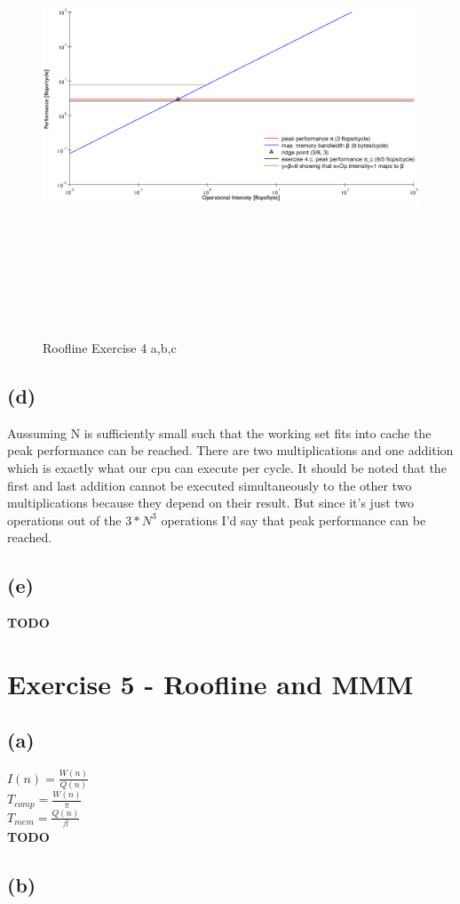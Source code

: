 \documentclass[10pt,a4paper,oneside,notitlepage]{report}
\begin{document}
\begin{landscape}
\begin{figure}[H]
\caption{Roofline Exercise 4 a,b,c}
\includegraphics[height=13cm]{roofline}
\label{roofline_plot}
\end{figure}
\end{landscape}

\subsection*{(d)}
Aussuming N is sufficiently small such that the working set fits into cache the peak performance can be reached. There are two multiplications and one addition which is exactly what our cpu can execute per cycle.
It should be noted that the first and last addition cannot be executed simultaneously to the other two multiplications because they depend on their result. But since it's just two operations out of the $3*N^3$ operations I'd say that peak performance can be reached.

\subsection*{(e)}
\textbf{TODO}

\section*{Exercise 5 - Roofline and MMM}
\subsection*{(a)}
$I(n)=\frac{W(n)}{Q(n)}$ \\
$T_{comp} = \frac{W(n)}{\pi}$ \\
$T_{mem} = \frac{Q(n)}{\beta}$ \\
\textbf{TODO}
\subsection*{(b)}
\end{document}
